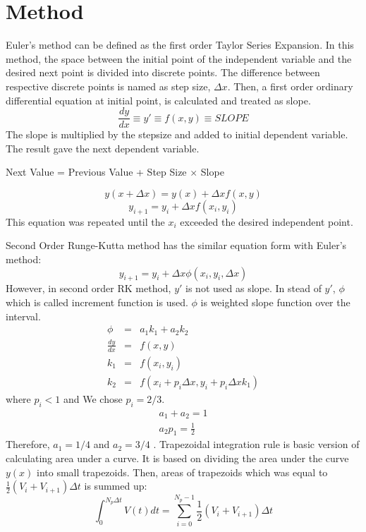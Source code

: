 \documentclass[letterpaper,12pt]{article}
\begin{document}
\section{Method}
Euler's method can be defined as the first order Taylor Series Expansion. In this method, the space between
the initial point of the independent variable and the desired next point is divided into discrete points. The 
difference between respective discrete points is named as step size, $\Delta x$. Then, a first order ordinary
differential equation at initial point, is calculated and treated as slope.
\begin{equation}
\frac{dy}{dx} \equiv y \prime \equiv f(x,y) \equiv SLOPE
\end{equation}
The slope is multiplied by the stepsize
and added to initial dependent variable. The result gave the next dependent variable.

\begin{center}
Next Value = Previous Value + Step Size $\times $ Slope
\end{center}
\begin{equation}
y(x + \Delta x ) = y(x) + \Delta x f(x,y)
\end{equation}
\begin{equation}
y_{i+1} = y_i + \Delta x f(x_i , y_i)
\label{eq:eul}
\end{equation}
This equation was repeated until the $x_i$ exceeded the desired independent point.

Second Order Runge-Kutta method has the similar equation form with Euler's method:
\begin{equation}
y_{i+1} = y_i + \Delta x \phi (x_i , y_i, \Delta x)
\label{eq:rk2}
\end{equation}
However, in second order RK method, $y\prime $ is not used as slope. In stead of $y\prime $, $\phi$ which is 
called increment function is used. $\phi$ is weighted slope function over the interval.
\begin{eqnarray}
\phi&=&a_1k_1 + a_2k_2\\
\frac{dy}{dx}&=&f(x,y) \nonumber\\
k_1&=&f(x_i,y_i) \nonumber\\
k_2&=&f(x_i+p_i\Delta x, y_i+p_i\Delta x k_1) \nonumber
\end{eqnarray}
where $p_i<1$  and
We chose $p_i = 2/3 $.
\begin{eqnarray}
a_1+a_2 = 1  \nonumber \\
a_2p_1 = \frac{1}{2} \nonumber 
\end{eqnarray}
Therefore, $a_1=1/4$ and $a_2=3/4$ .
Trapezoidal integration rule is basic version of calculating area under a curve. It is based on
dividing the area under the curve $y(x)$ into small trapezoids. Then, areas of trapezoids which was equal to 
$\frac {1}{2}(V_i+V_{i+1})\Delta t $ is summed up:
\begin{equation}
\int_{0}^{N_p\Delta t} V(t) dt = \sum_{i=0}^{N_p-1} \frac{1}{2}(V_i+V_{i+1}) \Delta t 
\end{equation}
\end{document}
